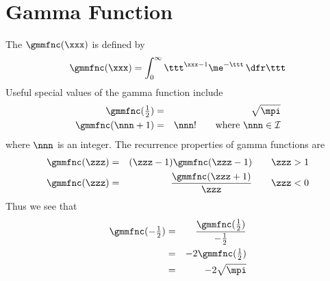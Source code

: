 \documentclass[12pt,twoside]{book}
\begin{document}
\section[Gamma Function]{Gamma Function}\label{sxn:gmm}
The  $\gmmfnc(\xxx)$ is defined by
\begin{equation}
\gmmfnc(\xxx) = \int_{0}^{\infty} \ttt^{\xxx-1} \me^{-\ttt} \,\dfr\ttt
\label{eqn:gmm_fnc_dfn}
\end{equation}
Useful special values of the gamma function include
\begin{eqnarray}
\gmmfnc({\textstyle{\frac{1}{2}}}) & = & \sqrt{\mpi} \\
\gmmfnc(\nnn+1) & = & \nnn! \qquad\mbox{where $\nnn \in \cal{I}$}
\label{eqn:gmm_fnc_dfn}
\end{eqnarray}
where $\nnn$ is an integer.
The recurrence properties of gamma functions are
\begin{eqnarray} 
\gmmfnc(\zzz) & = & (\zzz - 1)\gmmfnc(\zzz - 1) \qquad \zzz > 1
\nonumber \\
\gmmfnc(\zzz) & = & \frac{\gmmfnc(\zzz + 1)}{\zzz} \qquad \zzz < 0
\nonumber
\label{eqn:gmm_rcr_dfn}
\end{eqnarray}
Thus we see that 
\begin{eqnarray} 
\gmmfnc({\textstyle{-\frac{1}{2}}}) & = & 
\frac{\gmmfnc({\textstyle{\frac{1}{2}}})}{{\textstyle{-\frac{1}{2}}}} 
\nonumber \\
& = & - 2 \gmmfnc({\textstyle{\frac{1}{2}}}) \nonumber \\
& = & - 2 \sqrt{\mpi} 
\label{eqn:gmm_hlf_dfn}
\end{eqnarray}
\end{document}
